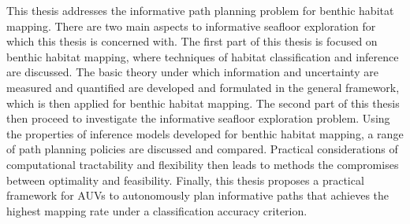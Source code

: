 		This thesis addresses the informative path planning problem for benthic habitat mapping. There are two main aspects to informative seafloor exploration for which this thesis is concerned with. The first part of this thesis is focused on benthic habitat mapping, where techniques of habitat classification and inference are discussed. The basic theory under which information and uncertainty are measured and quantified are developed and formulated in the general framework, which is then applied for benthic habitat mapping. The second part of this thesis then proceed to investigate the informative seafloor exploration problem. Using the properties of inference models developed for benthic habitat mapping, a range of path planning policies are discussed and compared. Practical considerations of computational tractability and flexibility then leads to methods the compromises between optimality and feasibility. Finally, this thesis proposes a practical framework for AUVs to autonomously plan informative paths that achieves the highest mapping rate under a classification accuracy criterion.
		
